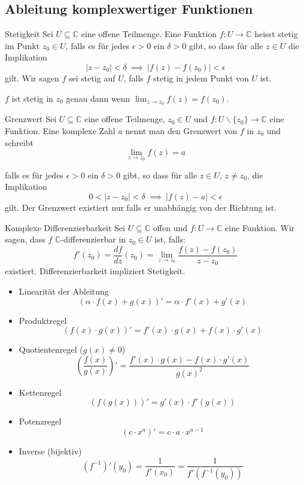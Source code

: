 \documentclass[a4paper,10pt]{article}
\def\C{\mathbb{C}}
\begin{document}
\subsection{Ableitung komplexwertiger Funktionen}

\begin{subbox}{Stetigkeit}
  Sei \(U\subseteq\mathbb{C}\) eine offene Teilmenge. Eine Funktion \(f\colon U\to\mathbb{C}\) heisst stetig im Punkt \(z_0\in U\), falls es für jedes \(\epsilon>0\) ein \(\delta >0\) gibt, so dass für alle \(z\in U\) die Implikation \[|z-z_0|<\delta ~\implies ~ |f(z)-f(z_0)|< \epsilon\] gilt. Wir sagen \(f\) sei stetig auf \(U\), falls \(f\) stetig in jedem Punkt von \(U\) ist.

  $f$ ist stetig in $z_0$ genau dann wenn $\lim_{z \to z_0} f(z) = f(z_0)$.
\end{subbox}

\begin{subbox}{Grenzwert}
  Sei \(U\subseteq\mathbb{C}\) eine offene Teilmenge, \(z_0\in U\) und \(f\colon U\smallsetminus\{z_0\}\to\mathbb{C}\) eine Funktion. Eine komplexe Zahl \(a\) nennt man den Grenzwert von \(f\) in \(z_0\) und schreibt
  $$
  \lim_{z\to z_0}f(z)=a
  $$
  
  falls es für jedes \(\epsilon>0\) ein \(\delta>0\) gibt, so dass für alle \(z\in U\), \(z\neq z_0\), die Implikation 
  $$
  0<|z-z_0|<\delta ~\implies ~ |f(z)-a|<\epsilon
  $$ gilt. Der Grenzwert existiert nur falls er unabhängig von der Richtung ist.
\end{subbox}

\begin{subbox}{Komplexe Differenzierbarkeit}
  Sei \(U \subseteq \mathbb{C}\) offen und \(f \colon U \to \mathbb{C}\) eine Funktion. Wir sagen, dass \(f\) $\C$-differenzierbar in \(z_0 \in U\) ist, falls:
  $$
  f'(z_0) = \frac{df}{dz}(z_0) = \lim_{z \to z_0} \dfrac{f(z)-f(z_0)}{z-z_0}
  $$
  existiert. Differenzierbarkeit impliziert Stetigkeit.
\end{subbox}

\begin{itemize}
  \item Linearität der Ableitung
  $$(\alpha \cdot f(x) + g(x))' = \alpha \cdot f'(x) + g'(x)$$
  \item Produktregel
  $$(f(x) \cdot g(x))' = f'(x) \cdot g(x) + f(x) \cdot g'(x)$$
  \item Quotientenregel ($g(x) \neq 0$)
  $$\left(\frac{f(x)}{g(x)}\right)' = \frac{f'(x) \cdot g(x) - f(x) \cdot g'(x)}{g(x)^2}$$
  \item Kettenregel
  $$(f(g(x)))' = g'(x) \cdot f'(g(x))$$
  \item Potenzregel
  $$(c \cdot x^a)' = c \cdot a \cdot x^{a - 1}$$
  \item{
    Inverse (bijektiv)
    $$
    (f^{-1})'(y_0) = \frac{1}{f'(x_0)} = \frac{1}{f'(f^{-1}(y_0))}
    $$
  }
\end{itemize}
\end{document}
